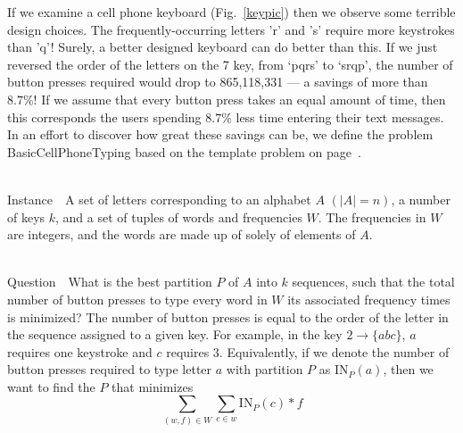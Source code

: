 \documentclass[runningheads]{llncs}
\newcommand{\Instance}{{\sc Instance~}}
\newcommand{\Question}{~\\
{\sc Question~}}
\begin{document}
If we examine a cell phone keyboard (Fig.~\ref{keypic}) then we observe some terrible design choices.  The frequently-occurring letters
'r' and 's' require more keystrokes than 'q'!  Surely, a better designed
keyboard can do better than this.  If we just reversed the order of the letters
on the 7 key, from `pqrs' to `srqp', the number of button presses required
would drop to 865,118,331 --- a savings of more than $8.7\%$!  If we assume
that every button press takes an equal amount of time, then this corresponds
the users spending $8.7\%$ less time entering their text messages.  In an
effort to discover how great these savings can be, we define the problem {\sc
BasicCellPhoneTyping} based on the template problem on
page~\pageref{probtemplate}.

\begin{prob}[{\sc BasicCellPhoneTyping}]~\\
\Instance\ A set of letters corresponding to an alphabet $A$ $(|A| =
n)$, a number of keys $k$, and a set of
tuples of words and frequencies $W$.  The frequencies in $W$ are integers,
and the words are made up of solely of elements of $A$. 

\Question\ What is the best partition $P$ of $A$ into $k$ sequences, such
that the total number of button presses to type every word in $W$ its
associated frequency times is minimized?  The number of button presses is equal
to the order of the letter in the sequence assigned to a given key.  For
example, in the key $2\to\{abc\}$, $a$ requires one keystroke and $c$ requires
3.  Equivalently, if we denote the number of button presses required to type
letter $a$ with partition $P$ as $\mathrm{IN}_P(a)$, then we want to find the $P$ that
minimizes $$\sum_{(w,f) \in W}\sum_{c\in w} \mathrm{IN}_P(c) * f$$
\label{bcpt}
\end{prob}
\end{document}
